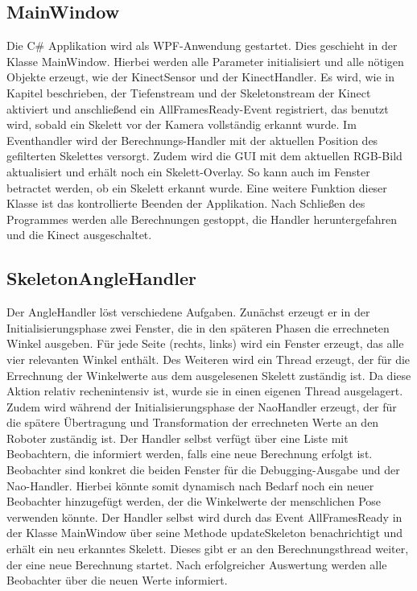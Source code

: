 \subsection{MainWindow}
Die C\# Applikation wird als WPF-Anwendung gestartet. Dies geschieht in der Klasse \textsf{MainWindow}. Hierbei werden alle Parameter initialisiert und alle nötigen Objekte erzeugt, wie der KinectSensor und der KinectHandler. Es wird, wie in Kapitel  beschrieben, der Tiefenstream und der Skeletonstream der Kinect aktiviert und anschließend ein AllFramesReady-Event registriert, das benutzt wird, sobald ein Skelett vor der Kamera vollständig erkannt wurde. Im Eventhandler wird der Berechnungs-Handler mit der aktuellen Position des gefilterten Skelettes versorgt. Zudem wird die GUI mit dem aktuellen RGB-Bild aktualisiert und erhält noch ein Skelett-Overlay. So kann auch im Fenster betractet werden, ob ein Skelett erkannt wurde. Eine weitere Funktion dieser Klasse ist das kontrollierte Beenden der Applikation. Nach Schließen des Programmes werden alle Berechnungen gestoppt, die Handler heruntergefahren und die Kinect ausgeschaltet.



\subsection{SkeletonAngleHandler}
Der \textsf{AngleHandler} löst verschiedene Aufgaben. Zunächst erzeugt er in der Initialisierungsphase zwei Fenster, die in den späteren Phasen die errechneten Winkel ausgeben. Für jede Seite (rechts, links) wird ein Fenster erzeugt, das alle vier relevanten Winkel enthält. Des Weiteren wird ein Thread erzeugt, der für die Errechnung der Winkelwerte aus dem ausgelesenen Skelett zuständig ist. Da diese Aktion relativ rechenintensiv ist, wurde sie in einen eigenen Thread ausgelagert. Zudem wird während der Initialisierungsphase der \textsf{NaoHandler} erzeugt, der für die spätere Übertragung und Transformation der errechneten Werte an den Roboter zuständig ist.
Der Handler selbst verfügt über eine Liste mit Beobachtern, die informiert werden, falls eine neue Berechnung erfolgt ist. Beobachter sind konkret die beiden Fenster für die Debugging-Ausgabe und der Nao-Handler. Hierbei könnte somit dynamisch nach Bedarf noch ein neuer Beobachter hinzugefügt werden, der die Winkelwerte der menschlichen Pose verwenden könnte.
Der Handler selbst wird durch das Event \textsf{AllFramesReady} in der Klasse MainWindow über seine Methode \textsf{updateSkeleton} benachrichtigt und erhält ein neu erkanntes Skelett. Dieses gibt er an den Berechnungsthread weiter, der eine neue Berechnung startet. Nach erfolgreicher Auswertung werden alle Beobachter über die neuen Werte informiert. 

